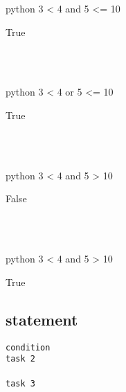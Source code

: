 \documentclass[aspectratio=1610,t]{beamer}
\begin{document}
\begin{pframe}
 \begin{ipython}
  \begin{pythonin}{python}
3 < 4 and 5 <= 10
  \end{pythonin}
  \begin{pythonout}
True
  \end{pythonout} \\ \\
  \begin{pythonin}{python}
3 < 4 or 5 <= 10
  \end{pythonin}
  \begin{pythonout}
True
  \end{pythonout} \\ \\
  \begin{pythonin}{python}
3 < 4 and 5 > 10
  \end{pythonin}
  \begin{pythonout}
False
  \end{pythonout}
 \\ \\
  \begin{pythonin}{python}
3 < 4 and 5 > 10
  \end{pythonin}
  \begin{pythonout}
True
  \end{pythonout}
 \end{ipython}
\end{pframe}


\subsection{ statement}
\begin{pframe}
 \begin{minipage}{0.47\textwidth}
 \begin{center}
  
 \end{center}
 \end{minipage}%
 \begin{minipage}{0.47\textwidth}
  \begin{pythondeclaration}
   \textvisiblespace\lstinline{condition}\emp{:}\\
   \textvisiblespace\textvisiblespace\textvisiblespace\textvisiblespace
   \lstinline{task 2}\\
   \\
   \textvisiblespace\textvisiblespace\textvisiblespace\textvisiblespace
   \lstinline{task 3}
  \end{pythondeclaration}
 \end{minipage}
\end{pframe}
\end{document}
